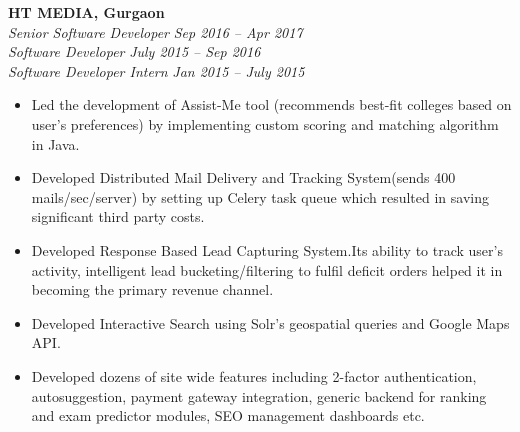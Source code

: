 \documentclass[margin,line]{resume}
\begin{document}
\begin{resume}
    \textbf{HT MEDIA, Gurgaon}\\
           \textsl{Senior Software Developer} \hfill \textsl{Sep 2016 -- Apr 2017} \vspace{0mm}\\\vspace{0mm}%
           \textsl{Software Developer} \hfill \textsl{July 2015 -- Sep 2016} \vspace{0mm}\\\vspace{0mm}%
           \textsl{Software Developer Intern} \hfill \textsl{Jan 2015 -- July 2015} \vspace{1mm}%
    \begin{itemize}
            \item Led the development of Assist-Me tool (recommends best-fit colleges based on user's preferences) by implementing custom scoring and matching algorithm in Java.
            \item Developed Distributed Mail Delivery and Tracking System(sends 400 mails/sec/server) by setting up Celery task queue which resulted in saving significant third party costs.
            \item Developed Response Based Lead Capturing System.Its ability to track user's activity, intelligent lead bucketing/filtering to fulfil deficit orders helped it in becoming the primary revenue channel.

            \item Developed Interactive Search using Solr's geospatial queries and Google Maps API.
            \item Developed dozens of site wide features including 2-factor authentication, autosuggestion, payment gateway integration, generic backend for ranking and exam predictor modules, SEO management dashboards etc.


\end{itemize}
\end{resume}
\end{document}
